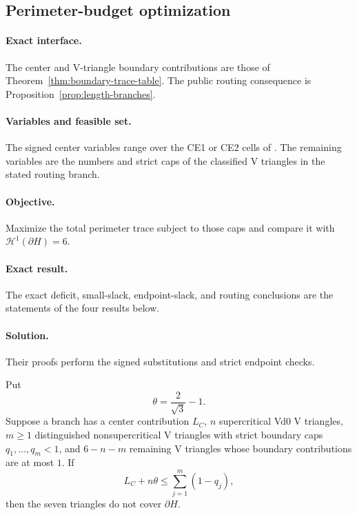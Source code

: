 \subsection{Perimeter-budget optimization}
\label{subsec:app-perimeter-budget-optimization}

\paragraph{Exact interface.}
The center and V-triangle boundary contributions are those of
Theorem~\ref{thm:boundary-trace-table}.  The public routing consequence is
Proposition~\ref{prop:length-branches}.

\paragraph{Variables and feasible set.}
The signed center variables range over the CE1 or CE2 cells of
.  The remaining variables
are the numbers and strict caps of the classified V triangles in the stated
routing branch.

\paragraph{Objective.}
Maximize the total perimeter trace subject to those caps and compare it with
$\mathcal H^1(\partial H)=6$.

\paragraph{Exact result.}
The exact deficit, small-slack, endpoint-slack, and routing conclusions are
the statements of the four results below.

\paragraph{Solution.}
Their proofs perform the signed substitutions and strict endpoint checks.

\begin{lemma}
\label{lem:signed-perimeter-deficit}
Put
\[
 \theta=\frac2{\sqrt3}-1.
\]
Suppose a branch has a center contribution $L_C$, $n$ supercritical Vd0
V triangles, $m\ge1$ distinguished nonsupercritical V triangles with strict boundary caps
$q_1,\ldots,q_m<1$, and $6-n-m$ remaining V triangles whose boundary contributions
are at most $1$. If
\begin{equation}
 L_C+n\theta\le\sum_{j=1}^m(1-q_j),
 \label{eq:signed-perimeter-deficit}
\end{equation}
then the seven triangles do not cover $\partial H$.
\end{lemma}

